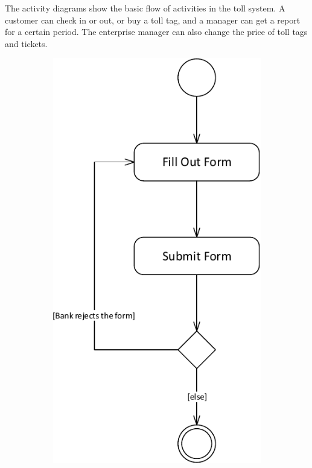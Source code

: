 The activity diagrams show the basic flow of activities in the toll system. A customer can check in or out, or buy a toll tag, and a manager can get a report for a certain period. The enterprise manager can also change the price of toll tags and tickets.

\begin{figure}[H]
	\centering
	\begin{subfigure}[b]{0.3\textwidth}
	\includegraphics[width=\textwidth]{img/activity_diagram/buy_toll_tag}

\end{subfigure}
\end{figure}

